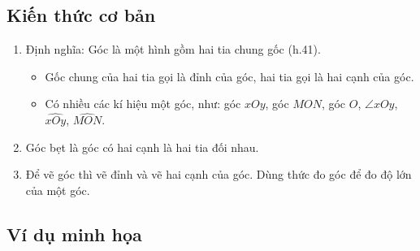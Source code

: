 \subsection{Kiến thức cơ bản}
\begin{enumerate}
	\item Định nghĩa: Góc là một hình gồm hai tia chung gốc (h.41).
	\begin{itemize}
		\item Gốc chung của hai tia gọi là đỉnh của góc, hai tia gọi là hai cạnh của góc.
		\item Có nhiều các kí hiệu một góc, như: góc $xOy$, góc $MON$, góc $O$, $\angle xOy$, $ \widehat{  xOy}$, $ \widehat{ MON}$.
	\end{itemize}
	\begin{center}
	\end{center}
\item  Góc bẹt là góc có hai cạnh là hai tia đối nhau.
\item Để vẽ góc thì vẽ đỉnh và vẽ hai cạnh của góc. Dùng thức đo góc để đo độ lớn của một góc.
\end{enumerate}
\subsection{Ví dụ minh họa} 

